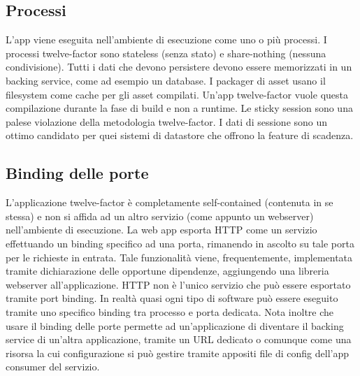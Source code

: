 \documentclass[PianoDiQualifica.tex]{subfiles}
\begin{document}
\subsection{Processi}
L'app viene eseguita nell'ambiente di esecuzione come uno o più processi. I processi twelve-factor sono stateless (senza stato) e share-nothing (nessuna condivisione). Tutti i dati che devono persistere devono essere memorizzati in un backing service, come ad esempio un database.
I packager di asset usano il filesystem come cache per gli asset compilati. Un'app twelve-factor vuole questa compilazione durante la fase di build e non a runtime.
Le sticky session sono una palese violazione della metodologia twelve-factor. I dati di sessione sono un ottimo candidato per quei sistemi di datastore che offrono la feature di scadenza.

\subsection{Binding delle porte}
L'applicazione twelve-factor è completamente self-contained (contenuta in se stessa) e non si affida ad un altro servizio (come appunto un webserver) nell'ambiente di esecuzione. La web app esporta HTTP come un servizio effettuando un binding specifico ad una porta, rimanendo in ascolto su tale porta per le richieste in entrata. Tale funzionalità viene, frequentemente, implementata tramite dichiarazione delle opportune dipendenze, aggiungendo una libreria webserver all'applicazione.
HTTP non è l'unico servizio che può essere esportato tramite port binding. In realtà quasi ogni tipo di software può essere eseguito tramite uno specifico binding tra processo e porta dedicata.
Nota inoltre che usare il binding delle porte permette ad un'applicazione di diventare il backing service di un'altra applicazione, tramite un URL dedicato o comunque come una risorsa la cui configurazione si può gestire tramite appositi file di config dell'app consumer del servizio.
\end{document}
